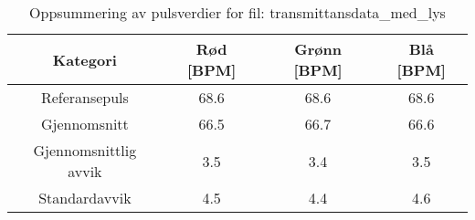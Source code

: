 
\begin{table}[H]
\centering
\caption{Oppsummering av pulsverdier for fil: transmittansdata\_med\_lys}
\label{tab:transmittansdata\_med\_lys\_summary}
\begin{tabular}{|c|c|c|c|}
\hline
\textbf{Kategori} & \textbf{Rød [BPM]} & \textbf{Grønn [BPM]} & \textbf{Blå [BPM]} \\ \hline
Referansepuls & 68.6 & 68.6 & 68.6 \\ \hline
Gjennomsnitt & 66.5 & 66.7 & 66.6 \\ \hline
Gjennomsnittlig avvik & 3.5 & 3.4 & 3.5 \\ \hline
Standardavvik & 4.5 & 4.4 & 4.6 \\ \hline
\end{tabular}
\end{table}
